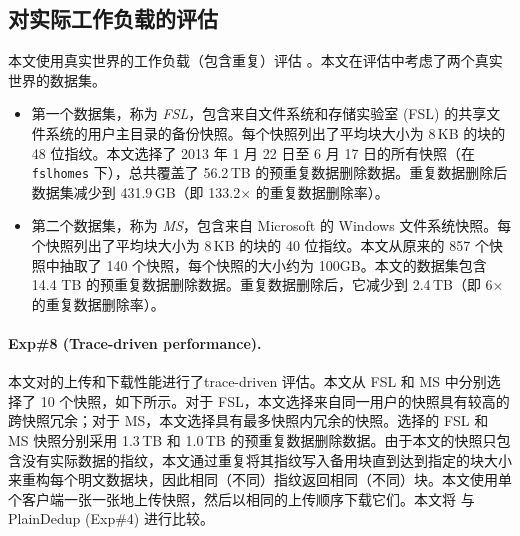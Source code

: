 \subsection{对实际工作负载的评估}
\label{subsec:sgxdedup-real-world}

本文使用真实世界的工作负载（包含重复）评估 \sysnameS。本文在评估中考虑了两个真实世界的数据集。
\begin{itemize}[leftmargin=*]
\item 第一个数据集，称为 \textit{ FSL}，包含来自文件系统和存储实验室 (FSL) \cite{fsl,sun16} 的共享文件系统的用户主目录的备份快照。每个快照列出了平均块大小为 8\,KB 的块的 48 位指纹。本文选择了 2013 年 1 月 22 日至 6 月 17 日的所有快照（在 \texttt{fslhomes} 下），总共覆盖了 56.2\,TB 的预重复数据删除数据。重复数据删除后数据集减少到 431.9\,GB（即 133.2$\times$ 的重复数据删除率）。
\item 第二个数据集，称为 \textit{ MS}，包含来自 Microsoft \cite{meyer2011deduplication} 的 Windows 文件系统快照。每个快照列出了平均块大小为 8\,KB 的块的 40 位指纹。本文从原来的 857 个快照中抽取了 140 个快照，每个快照的大小约为 100GB。本文的数据集包含 14.4 TB 的预重复数据删除数据。重复数据删除后，它减少到 2.4\,TB（即 6$\times$ 的重复数据删除率）。
\end{itemize}



\paragraph*{Exp\#8 (Trace-driven performance).} 本文对\sysnameS 的上传和下载性能进行了trace-driven 评估。本文从 FSL 和 MS 中分别选择了 10 个快照，如下所示。对于 FSL，本文选择来自同一用户的快照具有较高的跨快照冗余；对于 MS，本文选择具有最多快照内冗余的快照。选择的 FSL 和 MS 快照分别采用 1.3\,TB 和 1.0\,TB 的预重复数据删除数据。由于本文的快照只包含没有实际数据的指纹，本文通过重复将其指纹写入备用块直到达到指定的块大小来重构每个明文数据块，因此相同（不同）指纹返回相同（不同）块。本文使用单个客户端一张一张地上传快照，然后以相同的上传顺序下载它们。本文将 \sysnameS 与 PlainDedup (Exp\#4) 进行比较。

